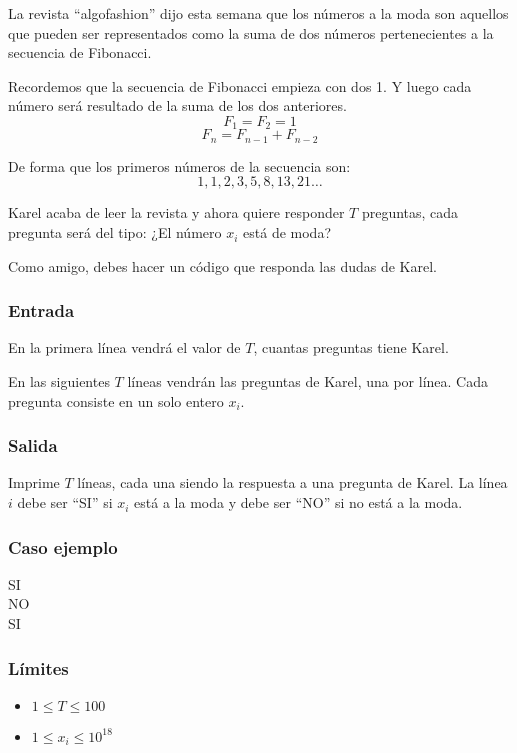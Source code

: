 La revista “algofashion” dijo esta semana que los números a la moda son aquellos que pueden ser representados como la suma de dos números pertenecientes a la secuencia de Fibonacci.

Recordemos que la secuencia de Fibonacci empieza con dos 1. Y luego cada número será resultado de la suma de los dos anteriores.
\[F_1=F_2=1\]
\[F_n=F_{n-1}+F_{n-2}\]

De forma que los primeros números de la secuencia son:
\[1,1,2,3,5,8,13,21\ldots\]

Karel acaba de leer la revista y ahora quiere responder \(T\) preguntas, cada pregunta será del tipo: ¿El número \(x_i\) está de moda?

Como amigo, debes hacer un código que responda las dudas de Karel.

\subsubsection*{Entrada}
En la primera línea vendrá el valor de \(T\), cuantas preguntas tiene Karel.

En las siguientes \(T\) líneas vendrán las preguntas de Karel, una por línea. Cada pregunta consiste en un solo entero \(x_i\).

\subsubsection*{Salida}
Imprime \(T\) líneas, cada una siendo la respuesta a una pregunta de Karel. La línea \(i\) debe ser “SI” si \(x_i\) está a la moda y debe ser “NO” si no está a la moda. 

\subsubsection*{Caso ejemplo}	

\begin{casebox2}
	{
		SI\\
		NO\\
		SI
	}
\end{casebox2}

\subsubsection*{Límites}

\begin{itemize}
	\setlength{\parskip}{1pt}	
	\item \(1\leq T \leq 100\)
	\item \(1\leq x_i \leq 10^{18}\)
\end{itemize}